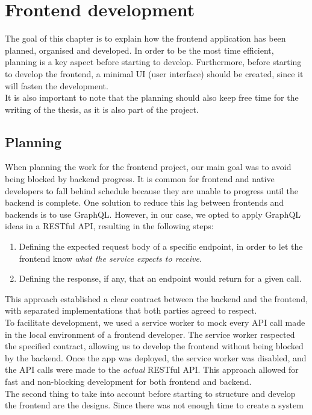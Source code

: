 \documentclass[../memory.tex]{subfiles}
\begin{document}
\chapter{Frontend development}
The goal of this chapter is to explain how the frontend application has been
planned, organised and developed. In order to be the most time efficient,
planning is a key aspect before starting to develop. Furthermore, before
starting to develop the frontend, a minimal UI (user interface) should be
created, since it will fasten the development.
\\
It is also important to note that the planning should also keep free time for
the writing of the thesis, as it is also part of the project.
\section{Planning}
When planning the work for the frontend project, our main goal was to avoid
being blocked by backend progress. It is common for frontend and native
developers to fall behind schedule because they are unable to progress until the
backend is complete. One solution to reduce this lag between frontends and
backends is to use GraphQL. However, in our case, we opted to apply GraphQL
ideas in a RESTful API, resulting in the following steps:
\begin{enumerate}[label = -]
	\item Defining the expected request body of a specific endpoint, in order to
	      let the frontend know \emph{what the service expects to receive}.
	\item Defining the response, if any, that an endpoint would return for a given call.
\end{enumerate}
This approach established a clear contract between the backend and the frontend,
with separated implementations that both parties agreed to respect.
\\
To facilitate development, we used a service worker to mock every API call made
in the local environment of a frontend developer. The service worker respected
the specified contract, allowing us to develop the frontend without being
blocked by the backend. Once the app was deployed, the service worker was
disabled, and the API calls were made to the \emph{actual} RESTful API. This
approach allowed for fast and non-blocking development for both frontend and
backend.
\\[8pt]
The second thing to take into account before starting to structure and develop
the frontend are the designs. Since there was not enough time to create a system
\end{document}
